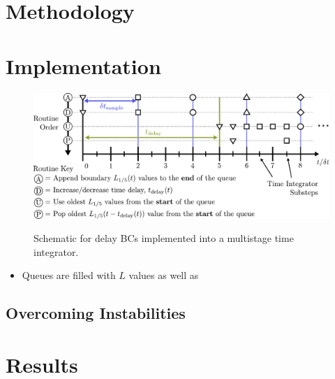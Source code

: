 \section{Methodology}

\section{Implementation}

\begin{figure}[h]
\centering
\includegraphics[scale=0.6]{assets/imgs/delay_bc_code_schematic.pdf}
\label{fig:schematic}
\caption{Schematic for delay BCs implemented into a multistage time integrator. }
\end{figure}


\begin{itemize}
\item Queues are filled with $L$ values as well as 
\end{itemize}

\subsection{Overcoming Instabilities}


\section{Results}



